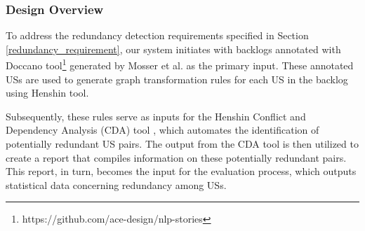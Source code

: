 \subsubsection*{Design Overview}
To address the redundancy detection requirements specified in Section \ref{redundancy_requirement}, our system initiates with backlogs annotated with Doccano tool\footnote{https://github.com/ace-design/nlp-stories} generated by Mosser et al. as the primary input\cite{arulmohan2023extracting}. These annotated USs are used to generate graph transformation rules for each US in the backlog using Henshin tool.

Subsequently, these rules serve as inputs for the Henshin Conflict and Dependency Analysis (CDA) tool \cite{mens2007analysing}, which automates the identification of potentially redundant US pairs. The output from the CDA tool is then utilized to create a report that compiles information on these potentially redundant pairs. This report, in turn, becomes the input for the evaluation process, which outputs statistical data concerning redundancy among USs.

